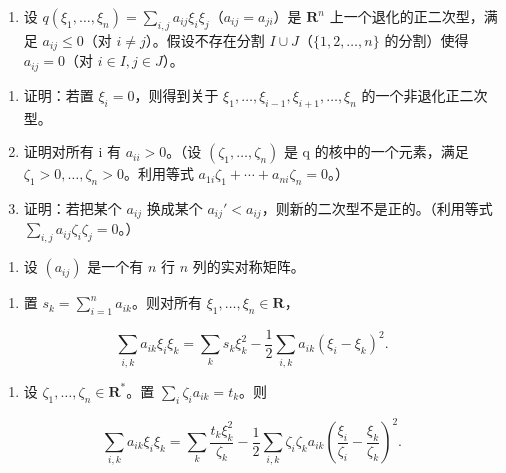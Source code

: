 \begin{enumerate}
\def\labelenumi{\arabic{enumi})}
\setcounter{enumi}{6}
\tightlist
\item
  设 \(q(\xi_1, \ldots, \xi_n) = \sum_{i,j} a_{ij} \xi_i \xi_j\)（\(a_{ij} = a_{ji}\)）是 \(\mathbf{R}^n\) 上一个退化的正二次型，满足 \(a_{ij} \leqslant 0\)（对 \(i \neq j\)）。假设不存在分割 \(I \cup J\)（\(\{1, 2, \ldots, n\}\) 的分割）使得 \(a_{ij} = 0\)（对 \(i \in I, j \in J\)）。
\end{enumerate}

\begin{enumerate}
\def\labelenumi{\alph{enumi})}
\item
  证明：若置 \(\xi_{i}=0\)，则得到关于 \(\xi_{1},\ldots,\xi_{i-1},\xi_{i+1},\ldots,\xi_{n}\) 的一个非退化正二次型。
\item
  证明对所有 i 有 \(a_{ii} > 0\)。（设 \((\zeta_{1}, \ldots, \zeta_{n})\) 是 q 的核中的一个元素，满足 \(\zeta_{1} > 0, \ldots, \zeta_{n} > 0\)。利用等式 \(a_{1i}\zeta_{1} + \cdots + a_{ni}\zeta_{n} = 0\)。）
\item
  证明：若把某个 \(a_{ij}\) 换成某个 \(a_{ij}' < a_{ij}\)，则新的二次型不是正的。（利用等式 \(\sum_{i,j} a_{ij} \zeta_i \zeta_j = 0\)。）
\end{enumerate}

\begin{enumerate}
\def\labelenumi{\arabic{enumi})}
\setcounter{enumi}{7}
\tightlist
\item
  设 \((a_{ij})\) 是一个有 \(n\) 行 \(n\) 列的实对称矩阵。
\end{enumerate}

\begin{enumerate}
\def\labelenumi{\alph{enumi})}
\tightlist
\item
  置 \(s_k = \sum_{i=1}^{n} a_{ik}\)。则对所有 \(\xi_1, \ldots, \xi_n \in \mathbf{R}\)，
\end{enumerate}

\[
\sum_ {i, k} a _ {i k} \xi_ {i} \xi_ {k} = \sum_ {k} s _ {k} \xi_ {k} ^ {2} - \frac {1}{2} \sum_ {i, k} a _ {i k} (\xi_ {i} - \xi_ {k}) ^ {2}.
\]

\begin{enumerate}
\def\labelenumi{\alph{enumi})}
\setcounter{enumi}{1}
\tightlist
\item
  设 \(\zeta_1, \ldots, \zeta_n \in \mathbf{R}^*\)。置 \(\sum_{i} \zeta_i a_{ik} = t_k\)。则
\end{enumerate}

\[
\sum_ {i, k} a _ {i k} \xi_ {i} \xi_ {k} = \sum_ {k} \frac {t _ {k} \xi_ {k} ^ {2}}{\zeta_ {k}} - \frac {1}{2} \sum_ {i, k} \zeta_ {i} \zeta_ {k} a _ {i k} \left(\frac {\xi_ {i}}{\zeta_ {i}} - \frac {\xi_ {k}}{\zeta_ {k}}\right) ^ {2}.
\]

